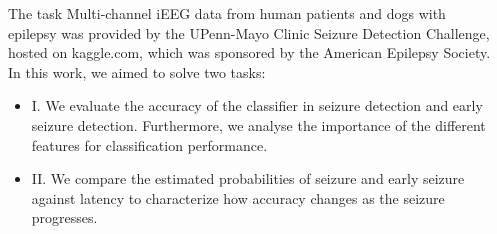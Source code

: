 \documentclass[final,t,overlay, xcolor=table, sans, mathserif]{beamer}
\begin{document}
\begin{frame}{}
\begin{columns}[t]
\begin{column}{.35\linewidth}
\end{column}
\begin{column}{.65\linewidth}

 
\begin{block}{The task}
Multi-channel iEEG data from human patients and dogs with epilepsy was provided by the UPenn-Mayo Clinic
Seizure Detection Challenge, hosted on kaggle.com, which was sponsored by the American Epilepsy Society. \\
In this work, we aimed to solve two tasks:
\begin{itemize}
\item I. We evaluate the accuracy of the classifier in seizure detection and early seizure detection. Furthermore, we
analyse the importance of the different features for classification performance.
\item II. We compare the estimated probabilities of seizure and early seizure against latency to characterize how accuracy
changes as the seizure progresses.
\end{itemize}
\end{block}




\end{column}
\end{columns}
\end{frame}
\end{document}
